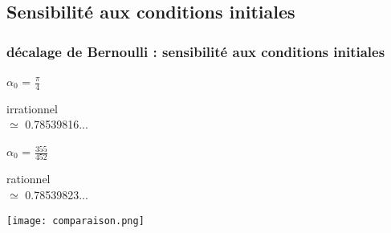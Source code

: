 \subsection{Sensibilité aux conditions initiales}
\begin{frame}
\frametitle{décalage de Bernoulli : sensibilité aux conditions initiales}
\begin{minipage}{0.49\textwidth}
 \begin{center}
  {\Large \textcolor{bleu}{$\alpha_0$} = $\frac{\pi}{4}$ \par} 
  \medskip
  irrationnel \\
  $\simeq$ 0.785398\textcolor{bleu}{16}...
 \end{center} 
\end{minipage}
\begin{minipage}{0.49\textwidth}
  \begin{center}
    {\Large \textcolor{rouge}{$\alpha_0$} = $\frac{355}{452}$ \par}
  	\medskip
	rationnel \\
	$\simeq$ 0.785398\textcolor{rouge}{23}...
\end{center}
\end{minipage}
\texttt{[image: comparaison.png]}
\end{frame}
